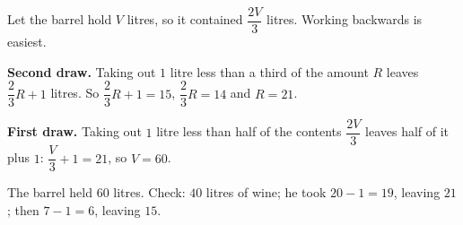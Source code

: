 Let the barrel hold $V$ litres, so it contained $\dfrac{2V}{3}$ litres. Working backwards is easiest.

\textbf{Second draw.} Taking out $1$ litre less than a third of the amount $R$ leaves $\dfrac{2}{3}R+1$ litres. So $\dfrac{2}{3}R+1=15$, $\dfrac{2}{3}R=14$ and $R=21$.

\textbf{First draw.} Taking out $1$ litre less than half of the contents $\dfrac{2V}{3}$ leaves half of it plus $1$: $\dfrac{V}{3}+1=21$, so $V=60$.

The barrel held $\boxed{60}$ litres. Check: $40$ litres of wine; he took $20-1=19$, leaving $21$; then $7-1=6$, leaving $15$.
